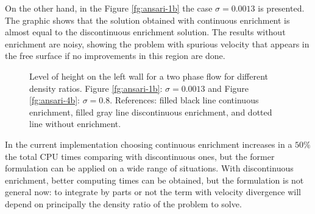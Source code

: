 On the other hand, in the Figure \ref{fg:ansari-1b} the case $\sigma=0.0013$ is presented. The graphic shows that the solution obtained with continuous enrichment is almost equal to the discontinuous enrichment solution. The results without enrichment are noisy, showing the problem with spurious velocity that appears in the free surface if no improvements in this region are done.

  \begin{figure}[h]
  \centering
   \caption{Level of height on the left wall for a two phase flow for different density ratios. Figure \ref{fg:ansari-1b}: $\sigma=0.0013$ and Figure \ref{fg:ansari-4b}: $\sigma=0.8$. References: filled black line continuous enrichment, filled gray line discontinuous enrichment, and dotted line without enrichment.}
   \label{fg:ansari-results-b}                %
\end{figure}

In the current implementation choosing continuous enrichment increases in a $50\%$ the total CPU times comparing with discontinuous ones, but the former formulation can be applied on a wide range of situations. With discontinuous enrichment, better computing times can be obtained, but the formulation is not general now: to integrate by parts or not the term with velocity divergence will depend on principally the density ratio of the problem to solve.

\clearpage
